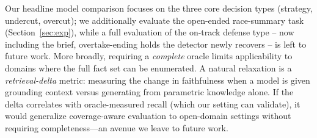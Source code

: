 \documentclass[11pt]{article}
\begin{document}
Our headline model comparison focuses on the three core decision types (strategy,
undercut, overcut); we additionally evaluate the open-ended race-summary task
(Section~\ref{sec:exp}), while a full evaluation of the on-track defense type -- now
including the brief, overtake-ending holds the detector newly recovers -- is left to
future work. More broadly, requiring a \emph{complete} oracle limits applicability to
domains where the full fact set can be enumerated. A natural relaxation is a
\emph{retrieval-delta} metric: measuring the change in faithfulness when a model is given
grounding context versus generating from parametric knowledge alone. If the delta
correlates with oracle-measured recall (which our setting can validate), it would
generalize coverage-aware evaluation to open-domain settings without requiring
completeness---an avenue we leave to future work.


\end{document}
